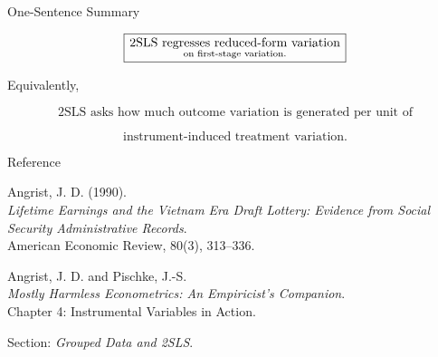 \documentclass[aspectratio=169]{beamer}
\begin{document}
\begin{frame}{One-Sentence Summary}

\begin{center}

\vspace{0.8cm}

{\Large
\[
\boxed{
\text{2SLS regresses reduced-form variation}
\atop
\text{on first-stage variation.}
}
\]
}

\vspace{0.7cm}

Equivalently,

\[
\boxed{
\text{2SLS asks how much outcome variation is generated per unit of}
}
\]

\[
\boxed{
\text{instrument-induced treatment variation.}
}
\]

\end{center}

\end{frame}

\begin{frame}{Reference}

\small

Angrist, J. D. (1990).\\
\textit{Lifetime Earnings and the Vietnam Era Draft Lottery: Evidence from Social Security Administrative Records}.\\
American Economic Review, 80(3), 313--336.

\vspace{0.5cm}

Angrist, J. D. and Pischke, J.-S.\\
\textit{Mostly Harmless Econometrics: An Empiricist's Companion}.\\
Chapter 4: Instrumental Variables in Action.

\vspace{0.5cm}

Section: \textit{Grouped Data and 2SLS}.

\end{frame}

\end{document}
